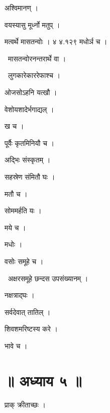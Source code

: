 \documentclass[10pt, openany, oneside]{book}
\begin{document}
\noindent अश्विमानण् ।

\noindent वयस्यासु मूर्ध्नो मतुप् ।

\noindent मत्वर्थे मासतन्वोः । ४ ४.१२९ मधोर्ञ च ।

\par\noindent\hspace{1.5em}{\vps वा॰}~{\qt मासतन्वोरनन्तरार्थे वा ।}

\par\noindent\hspace{1.5em}{\vps वा॰}~{\qt लुगकारेकाररेफाश्च ।}

\noindent ओजसोऽहनि यत्खौ ।

\noindent वेशोयशादेर्भगाद्यल् ।

\noindent ख च ।

\noindent पूर्वैः कृतमिनियौ च ।

\noindent अद्भिः संस्कृतम् ।

\noindent सहस्रेण संमितौ घः ।

\noindent मतौ च ।

\noindent सोममर्हति यः ।

\noindent मये च ।

\noindent मधोः ।

\noindent वसोः समूहे च ।

\par\noindent\hspace{1.5em}{\vps वा॰}~{\qt अक्षरसमूहे छन्दस उपसंख्यानम् ।}

\noindent नक्षत्राद्घः ।

\noindent सर्वदेवात् तातिल् ।

\noindent शिवशमरिष्टस्य करे ।

\noindent भावे च ।

\section*{॥ अध्याय ५ ॥}

\noindent प्राक् क्रीताच्छः ।
\end{document}

